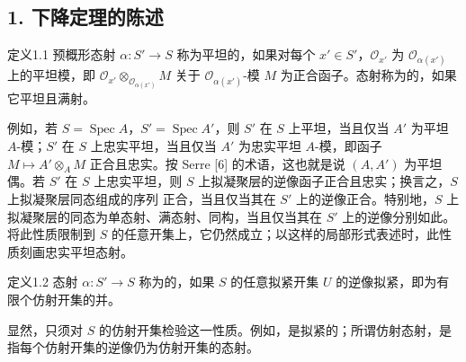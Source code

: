 \subsection*{1. 下降定理的陈述}
\begin{statement}{定义1.1}
预概形态射 $\alpha:S'\to S$ 称为平坦的，如果对每个 $x'\in S'$，$\mathcal O_{x'}$ 为 $\mathcal O_{\alpha(x')}$ 上的平坦模，即 $\mathcal O_{x'}\otimes_{\mathcal O_{\alpha(x')}}M$ 关于 $\mathcal O_{\alpha(x')}$-模 $M$ 为正合函子。态射称为的，如果它平坦且满射。
\end{statement}
例如，若 $S=\operatorname{Spec}A$，$S'=\operatorname{Spec}A'$，则 $S'$ 在 $S$ 上平坦，当且仅当 $A'$ 为平坦 $A$-模；$S'$ 在 $S$ 上忠实平坦，当且仅当 $A'$ 为忠实平坦 $A$-模，即函子 $M\mapsto A'\otimes_AM$ 正合且忠实。按 Serre [6] 的术语，这也就是说 $(A,A')$ 为平坦偶。若 $S'$ 在 $S$ 上忠实平坦，则 $S$ 上拟凝聚层的逆像函子正合且忠实；换言之，$S$ 上拟凝聚层同态组成的序列
正合，当且仅当其在 $S'$ 上的逆像正合。特别地，$S$ 上拟凝聚层的同态为单态射、满态射、同构，当且仅当其在 $S'$ 上的逆像分别如此。将此性质限制到 $S$ 的任意开集上，它仍然成立；以这样的局部形式表述时，此性质刻画忠实平坦态射。
\begin{statement}{定义1.2}
态射 $\alpha:S'\to S$ 称为的，如果 $S$ 的任意拟紧开集 $U$ 的逆像拟紧，即为有限个仿射开集的并。
\end{statement}
显然，只须对 $S$ 的仿射开集检验这一性质。例如，是拟紧的；所谓仿射态射，是指每个仿射开集的逆像仍为仿射开集的态射。

